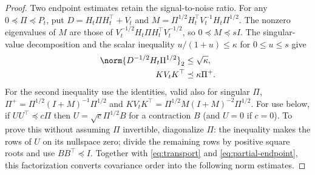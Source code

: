 \begin{proof}
Two endpoint estimates retain the signal-to-noise ratio. For any
$0\preceq\Pi\preceq P_t$, put $D=H_t\Pi H_t^\top+V_t$ and
$M=\Pi^{1/2}H_t^\top V_t^{-1}H_t\Pi^{1/2}$.
The nonzero eigenvalues of $M$ are those of
$V_t^{-1/2}H_t\Pi H_t^\top V_t^{-1/2}$, so $0\preceq M\preceq sI$.
The singular-value decomposition and the scalar inequality
$u/(1+u)\le\kappa$ for $0\le u\le s$ give
\begin{align}
 \norm{D^{-1/2}H_t\Pi^{1/2}}_2&\le\sqrt\kappa,
 \label{eq:partial-endpoint}\\
 K V_tK^\top&\preceq\kappa\Pi^+.
 \label{eq:partial-gain}
\end{align}
For the second inequality use the identities, valid also for singular $\Pi$,
$\Pi^+=\Pi^{1/2}(I+M)^{-1}\Pi^{1/2}$ and
$KV_tK^\top=\Pi^{1/2}M(I+M)^{-2}\Pi^{1/2}$.
For use below, if $UU^\top\preceq c\Pi$ then
$U=\sqrt c\Pi^{1/2}B$ for a contraction $B$ (and $U=0$ if $c=0$).
To prove this without assuming $\Pi$ invertible, diagonalize $\Pi$:
the inequality makes the rows of $U$ on its nullspace zero; divide the
remaining rows by positive square roots and use $BB^\top\preceq I$.
Together with \eqref{eq:transport} and \eqref{eq:partial-endpoint}, this
factorization converts covariance order into the following norm estimates.


\end{proof}
